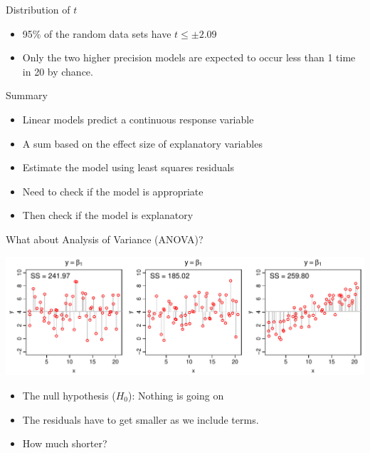 \documentclass[xcolor=x11names,compress]{beamer}
\renewcommand{\(}{\begin{columns}}
\renewcommand{\)}{\end{columns}}
\newcommand{\<}[1]{\begin{column}{#1}}
\renewcommand{\>}{\end{column}}
\begin{document}
\begin{frame}{Distribution of $t$}


\centerline{}

\begin{itemize}
\item 95\% of the random data sets have $t\le \pm 2.09$
\item Only the two higher precision models are expected to occur less than 1 time in 20 by chance.
\end{itemize}

\end{frame}


\begin{frame}{Summary}

\begin{itemize}
    \item Linear models predict a continuous response variable
    \item A sum based on the effect size of explanatory variables
    \item Estimate the model using least squares residuals
    \item Need to check if the model is appropriate
    \item Then check if the model is explanatory
\end{itemize}

\end{frame}


\begin{frame}{What about Analysis of Variance (ANOVA)?}

\includegraphics[width=\textwidth]{ANOVA_null.pdf}

\begin{itemize}
\item The null hypothesis ($H_0$): Nothing is going on
\item The residuals have to get smaller as we include terms.
\item How much shorter?
\end{itemize}

\end{frame}
\end{document}
